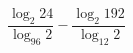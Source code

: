 \begin{ex}
	\begin{condition}
		\( \dfrac{\log_2 24}{\log_{96} 2}-\dfrac{\log_2 192}{\log_{12} 2} \)
	\end{condition}
\end{ex}
